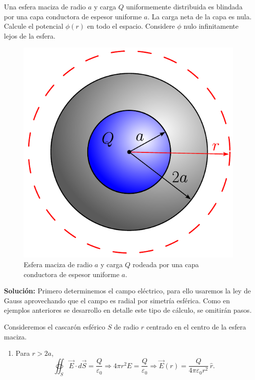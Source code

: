 \begin{ejemplo}
    Una esfera maciza de radio $a$ y carga $Q$ uniformemente distribuida es blindada por una capa conductora de espesor uniforme $a$. La carga neta de la capa es nula. Calcule el potencial $\phi(r)$ en todo el espacio. Considere $\phi$ nulo infinitamente lejos de la esfera.
    \begin{figure}[H]
        \centering
        \includegraphics[scale = 0.6]{Figuras/Ej-Conductor.pdf}
        \caption{Esfera maciza de radio $a$ y carga $Q$ rodeada por una capa conductora de espesor uniforme $a$.}
        \label{fig:Ej-Conductor}
    \end{figure}
    
    \textbf{Solución:} Primero determinemos el campo eléctrico, para ello usaremos la ley de Gauss aprovechando que el campo es radial por simetría esférica. Como en ejemplos anteriores se desarrollo en detalle este tipo de cálculo, se omitirán pasos.

    Consideremos el cascarón esférico $S$ de radio $r$ centrado en el centro de la esfera maciza. 

    \begin{enumerate}
        \item Para $r > 2a$, 
        $$\oiint_S \Vec{E} \cdot d\Vec{S} = \frac{Q}{\varepsilon_0} \Rightarrow 4\pi r^2 E = \frac{Q}{\varepsilon_0} \Rightarrow \Vec{E}(r) = \frac{Q}{4\pi\varepsilon_0 r^2} \,\hat{r}.$$


\end{enumerate}
\end{ejemplo}
